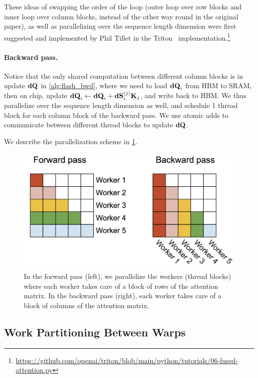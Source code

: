 These ideas of swapping the order of the loop (outer loop over row blocks and
inner loop over column blocks, instead of the other way round in the original
\sysnameone paper), as well as parallelizing over the sequence length dimension
were first suggested and implemented by Phil Tillet in the
Triton~\citep{tillet2019triton}
implementation.\footnote{\url{https://github.com/openai/triton/blob/main/python/tutorials/06-fused-attention.py}}

\paragraph{Backward pass.}
Notice that the only shared computation between different column blocks is in
update $\mathbf{dQ}$ in \cref{alg:flash_bwd}, where we need to load $\mathbf{dQ}_i$ from HBM
to SRAM, then on chip, update
$\mathbf{dQ}_{i} \leftarrow \mathbf{dQ}_i + \mathbf{dS}_{i}^{(j)} \mathbf{K}_j$, and write back to HBM.
We thus parallelize over the sequence length dimension as well, and schedule 1
thread block for each column block of the backward pass.
We use atomic adds to communicate between different thread blocks to update $\mathbf{dQ}$.

We describe the parallelization scheme in \cref{fig:parallelism}.
\begin{figure}[ht]
  \centering
  \includegraphics[width=0.95\linewidth]{figs/flashattention_fwd_bwd_parallel.png}
  \caption{\label{fig:parallelism}In the forward pass (left), we parallelize the
    workers (thread blocks) where each worker takes care of a block of rows of
    the attention matrix.
    In the backward pass (right), each worker takes care of a block of columns
    of the attention matrix.}
\end{figure}


\subsection{Work Partitioning Between Warps}
\label{subsec:work_partitioning}

